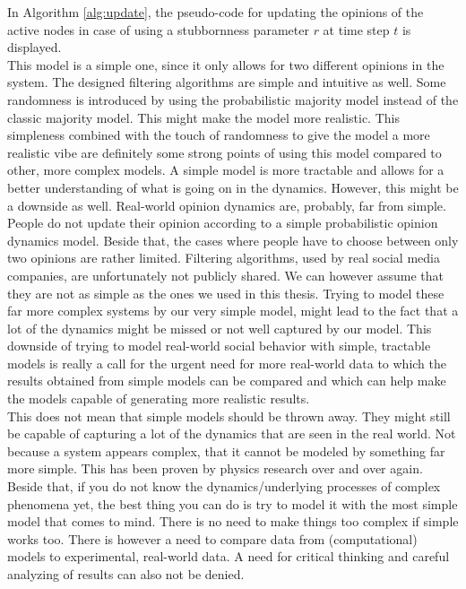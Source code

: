 \documentclass[11 pt , letterpaper , twoside , openright]{book}
\begin{document}
\newline
In Algorithm \ref{alg:update}, the pseudo-code for updating the opinions of the active nodes in case of using a stubbornness parameter $r$ at time step $t$ is displayed. \\
\newline
This model is a simple one, since it only allows for two different opinions in the system. The designed filtering algorithms are simple and intuitive as well. Some randomness is introduced by using the probabilistic majority model instead of the classic majority model. This might make the model more realistic. This simpleness combined with the touch of randomness to give the model a more realistic vibe are definitely some strong points of using this model compared to other, more complex models. A simple model is more tractable and allows for a better understanding of what is going on in the dynamics. However, this might be a downside as well. Real-world opinion dynamics are, probably, far from simple. People do not update their opinion according to a simple probabilistic opinion dynamics model. Beside that, the cases where people have to choose between only two opinions are rather limited. Filtering algorithms, used by real social media companies, are unfortunately not publicly shared. We can however assume that they are not as simple as the ones we used in this thesis. Trying to model these far more complex systems by our very simple model, might lead to the fact that a lot of the dynamics might be missed or not well captured by our model. This downside of trying to model real-world social behavior with simple, tractable models is really a call for the urgent need for more real-world data to which the results obtained from simple models can be compared and which can help make the models capable of generating more realistic results. \\
\newline
This does not mean that simple models should be thrown away. They might still be capable of capturing a lot of the dynamics that are seen in the real world. Not because a system appears complex, that it cannot be modeled by something far more simple. This has been proven by physics research over and over again. Beside that, if you do not know the dynamics/underlying processes of complex phenomena yet, the best thing you can do is try to model it with the most simple model that comes to mind. There is no need to make things too complex if simple works too. There is however a need to compare data from (computational) models to experimental, real-world data. A need for critical thinking and careful analyzing of results can also not be denied.
\end{document}
